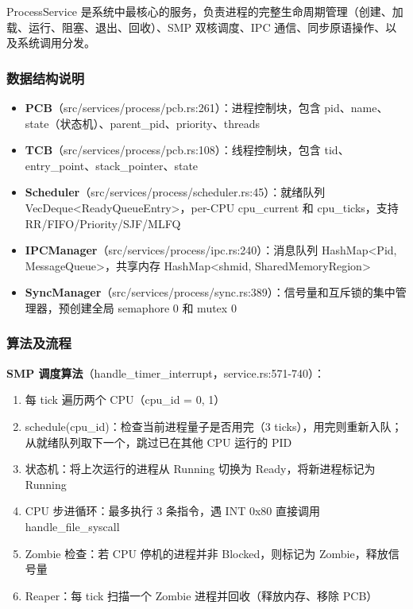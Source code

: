 \documentclass[UTF8,a4paper,12pt]{ctexart}
\begin{document}
ProcessService 是系统中最核心的服务，负责进程的完整生命周期管理（创建、加载、运行、阻塞、退出、回收）、SMP 双核调度、IPC 通信、同步原语操作、以及系统调用分发。

\subsubsection{数据结构说明}

\begin{itemize}
    \item \textbf{PCB}（src/services/process/pcb.rs:261）：进程控制块，包含 pid、name、state（状态机）、parent\_pid、priority、threads
    \item \textbf{TCB}（src/services/process/pcb.rs:108）：线程控制块，包含 tid、entry\_point、stack\_pointer、state
    \item \textbf{Scheduler}（src/services/process/scheduler.rs:45）：就绪队列 VecDeque<ReadyQueueEntry>，per-CPU cpu\_current 和 cpu\_ticks，支持 RR/FIFO/Priority/SJF/MLFQ
    \item \textbf{IPCManager}（src/services/process/ipc.rs:240）：消息队列 HashMap<Pid, MessageQueue>，共享内存 HashMap<shmid, SharedMemoryRegion>
    \item \textbf{SyncManager}（src/services/process/sync.rs:389）：信号量和互斥锁的集中管理器，预创建全局 semaphore 0 和 mutex 0
\end{itemize}

\subsubsection{算法及流程}

\textbf{SMP 调度算法}（handle\_timer\_interrupt，service.rs:571-740）：

\begin{enumerate}[label=(\arabic*)]
    \item 每 tick 遍历两个 CPU（cpu\_id = 0, 1）
    \item schedule(cpu\_id)：检查当前进程量子是否用完（3 ticks），用完则重新入队；从就绪队列取下一个，跳过已在其他 CPU 运行的 PID
    \item 状态机：将上次运行的进程从 Running 切换为 Ready，将新进程标记为 Running
    \item CPU 步进循环：最多执行 3 条指令，遇 INT 0x80 直接调用 handle\_file\_syscall
    \item Zombie 检查：若 CPU 停机的进程并非 Blocked，则标记为 Zombie，释放信号量
    \item Reaper：每 tick 扫描一个 Zombie 进程并回收（释放内存、移除 PCB）
\end{enumerate}
\end{document}

